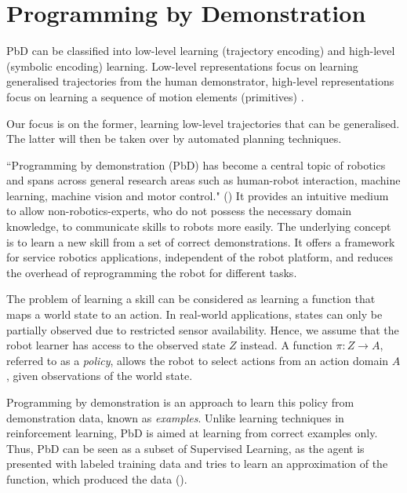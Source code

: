 \section{Programming by Demonstration}
PbD can be classified into low-level learning (trajectory encoding) and high-level (symbolic encoding) learning.
 Low-level representations focus on learning generalised trajectories from the human demonstrator, high-level representations focus on learning a sequence of motion elements (primitives) \cite{peppoloni2014ros}.

Our focus is on the former, learning low-level trajectories that can be generalised.
 The latter will then be taken over by automated planning techniques.

``Programming by demonstration (PbD) has become a central topic of robotics and spans across general research areas such as human-robot interaction, machine learning, machine vision and motor control." (\cite{billard2008robot})
It provides an intuitive medium to allow non-robotics-experts, who do not possess the necessary domain knowledge, to communicate skills to robots more easily.
 The underlying concept is to learn a new skill from a set of correct demonstrations.
It offers a framework for service robotics applications, independent of the robot platform, and reduces the overhead of reprogramming the robot for different tasks.

The problem of learning a skill can be considered as learning a function that maps a world state to an action.
 In real-world applications, states can only be partially observed due to restricted sensor availability.
 Hence, we assume that the robot learner has access to the observed state $Z$ instead.
 A function $\pi : Z \rightarrow A$, referred to as a \textit{policy}, allows the robot to select actions from an action domain $A$, given observations of the world state.
 
Programming by demonstration is an approach to learn this policy from demonstration data, known as \textit{examples}.
Unlike learning techniques in reinforcement learning, PbD is aimed at learning from correct examples only.
 Thus, PbD can be seen as a subset of Supervised Learning, as the agent is presented with labeled training data and tries to learn an approximation of the function, which produced the data (\cite{argall2009survey}).

